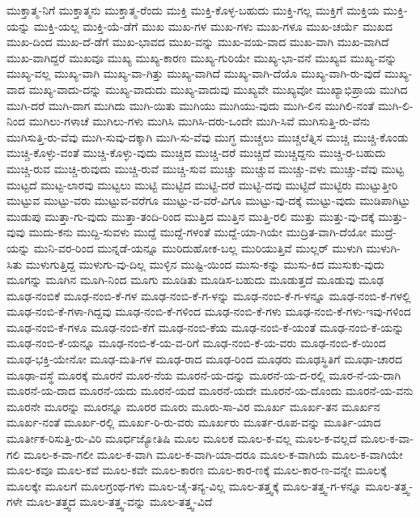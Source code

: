 {ಮುಕ್ತಾತ್ಮ-ನಿಗೆ
ಮುಕ್ತಾತ್ಮನು
ಮುಕ್ತಾತ್ಮ-ರೆಂದು
ಮುಕ್ತಿ
ಮುಕ್ತಿ-ಕೊಳ್ಳ-ಬಹುದು
ಮುಕ್ತಿ-ಗಲ್ಲ
ಮುಕ್ತಿಗೆ
ಮುಕ್ತಿಯ
ಮುಕ್ತಿ-ಯನ್ನು
ಮುಕ್ತಿ-ಯಲ್ಲ
ಮುಕ್ತಿ-ಯೆ-ಡೆಗೆ
ಮುಖ
ಮುಖ-ಗಳ
ಮುಖ-ಗಳು
ಮುಖ-ಗಳೂ
ಮುಖ-ಚರ್ಯೆ
ಮುಖದ
ಮುಖ-ದಿಂದ
ಮುಖ-ದೆ-ಡೆಗೆ
ಮುಖ-ಭಾವದ
ಮುಖ-ವನ್ನು
ಮುಖ-ವಯ-ವಾದ
ಮುಖ-ವಾಗಿ
ಮುಖ-ವಾಗಿದೆ
ಮುಖ-ವಾಗಿದ್ದರೆ
ಮುಖವೂ
ಮುಖ್ಯ
ಮುಖ್ಯ-ಕಾರಣ
ಮುಖ್ಯ-ಗುರಿಯೇ
ಮುಖ್ಯ-ಭಾ-ವನೆ
ಮುಖ್ಯವ
ಮುಖ್ಯ-ವನ್ನು
ಮುಖ್ಯ-ವಲ್ಲ
ಮುಖ್ಯ-ವಾಗಿ
ಮುಖ್ಯ-ವಾ-ಗಿತ್ತು
ಮುಖ್ಯ-ವಾಗಿದೆ
ಮುಖ್ಯ-ವಾಗಿ-ದೆಯೊ
ಮುಖ್ಯ-ವಾಗಿ-ರು-ವುದೆ
ಮುಖ್ಯ-ವಾದ
ಮುಖ್ಯ-ವಾದು-ದನ್ನು
ಮುಖ್ಯ-ವಾದುದು
ಮುಖ್ಯ-ವಾದುವು
ಮುಖ್ಯವೇ
ಮುಖ್ಯವೋ
ಮುಖ್ಯಾಭಿಪ್ರಾಯ
ಮುಗಿದ
ಮುಗಿ-ದರೆ
ಮುಗಿ-ದಾಗ
ಮುಗಿದು
ಮುಗಿ-ಯಿತು
ಮುಗಿಯು
ಮುಗಿಯು-ವುದು
ಮುಗಿ-ಲಿನ
ಮುಗಿಲಿ-ನಂತೆ
ಮುಗಿ-ಲಿ-ನಿಂದ
ಮುಗಿಲು-ಗಳಾಚೆ
ಮುಗಿಲು-ಗಳು
ಮುಗಿಸಿ
ಮುಗಿಸಿ-ದರು-ಒಂದೇ
ಮುಗಿ-ಸಿವೆ
ಮುಗಿಸುತ್ತಿ-ರು-ವೆನು
ಮುಗಿಸುತ್ತಿ-ರು-ವೆವು
ಮುಗಿ-ಸುವು-ದಕ್ಕಾಗಿ
ಮುಗಿ-ಸು-ವೆವು
ಮುಗ್ಧ
ಮುಚ್ಚಲು
ಮುಚ್ಚಲೆತ್ನಿಸ
ಮುಚ್ಚಿ
ಮುಚ್ಚಿ-ಕೊಂಡು
ಮುಚ್ಚಿ-ಕೊಳ್ಳು-ವಂತೆ
ಮುಚ್ಚಿ-ಕೊಳ್ಳು-ವುದು
ಮುಚ್ಚಿದ
ಮುಚ್ಚಿ-ದರೆ
ಮುಚ್ಚಿದೆ
ಮುಚ್ಚಿದ್ದನು
ಮುಚ್ಚಿ-ರ-ಬಹುದು
ಮುಚ್ಚಿ-ರುವ
ಮುಚ್ಚಿ-ರುವುದು
ಮುಚ್ಚಿ-ರುವೆ
ಮುಚ್ಚಿ-ಸುವ
ಮುಚ್ಚು
ಮುಚ್ಚುವ
ಮುಚ್ಚು-ವಳು
ಮುಚ್ಚು-ವೆವು
ಮುಟ್ಟ
ಮುಟ್ಟದೆ
ಮುಟ್ಟ-ಲಾರವು
ಮುಟ್ಟಲು
ಮುಟ್ಟಿ
ಮುಟ್ಟಿದ
ಮುಟ್ಟಿ-ದರೆ
ಮುಟ್ಟಿ-ದವು
ಮುಟ್ಟಿದೆ
ಮುಟ್ಟಿರು
ಮುಟ್ಟುತ್ತೀರಿ
ಮುಟ್ಟುವ
ಮುಟ್ಟು-ವರು
ಮುಟ್ಟುವ-ವರೆಗೂ
ಮುಟ್ಟು-ವ-ವರೆ-ವಿಗೂ
ಮುಟ್ಟು-ವು-ದಕ್ಕೆ
ಮುಟ್ಟು-ವುದು
ಮುಡಿಪಾಗಿಟ್ಟು
ಮುಡುಪು
ಮುತ್ತಾ-ಗು-ವುದು
ಮುತ್ತಾ-ತಂದಿ-ರಿಂದ
ಮುತ್ತಿದ
ಮುತ್ತಿನ
ಮುತ್ತಿ-ರಲಿ
ಮುತ್ತು
ಮುತ್ತು-ವು-ದಕ್ಕೆ
ಮುತ್ತು-ವುವು
ಮುದು-ಕನು
ಮುದ್ದಿ-ಸುವಳು
ಮುದ್ದೆ
ಮುದ್ದೆ-ಗಳಂತೆ
ಮುದ್ದೆ-ಯಾ-ಗಿಯೇ
ಮುದ್ರಿತ-ವಾಗಿ-ದೆಯೋ
ಮುದ್ರೆ-ಯನ್ನು
ಮುನಿ-ವರ-ರಿಂದ
ಮುನ್ನಡೆ-ಯನ್ನೂ
ಮುರಿದುಹೋಕ-ಬಲ್ಲ
ಮುರಿಯುತ್ತಿವೆ
ಮುಲ್ಲರ್
ಮುಳುಗಿ
ಮುಳುಗಿ-ಸಿತು
ಮುಳುಗುತ್ತಿದ್ದ
ಮುಳುಗು-ವು-ದಿಲ್ಲ
ಮುಳ್ಳಿನ
ಮುಷ್ಟಿ-ಯಿಂದ
ಮುಸು-ಕನ್ನು
ಮುಸು-ಕಿದ
ಮುಸುಕು-ವುದು
ಮೂಗನ್ನು
ಮೂಗಿನ
ಮೂಗಿ-ನಿಂದ
ಮೂಗು
ಮೂಡಿತು
ಮೂಡಿಸ-ಬಹುದು
ಮೂಡುತ್ತದೆ
ಮೂಡುವು
ಮೂಢ
ಮೂಢ-ನಂಬಿಕೆ
ಮೂಢ-ನಂಬಿ-ಕೆ-ಗಳ
ಮೂಢ-ನಂಬಿ-ಕೆ-ಗ-ಳನ್ನು
ಮೂಢ-ನಂಬಿ-ಕೆ-ಗ-ಳನ್ನೂ
ಮೂಢ-ನಂಬಿ-ಕೆ-ಗಳಲ್ಲಿ
ಮೂಢ-ನಂಬಿ-ಕೆ-ಗಳಾ-ಗಿದ್ದವು
ಮೂಢ-ನಂಬಿ-ಕೆ-ಗಳಿಂದ
ಮೂಢ-ನಂಬಿ-ಕೆ-ಗಳು
ಮೂಢ-ನಂಬಿ-ಕೆ-ಗಳು-ಇವು-ಗಳಿಂದ
ಮೂಢ-ನಂಬಿ-ಕೆ-ಗಳೂ
ಮೂಢ-ನಂಬಿ-ಕೆಗೆ
ಮೂಢ-ನಂಬಿ-ಕೆಯ
ಮೂಢ-ನಂಬಿ-ಕೆ-ಯಂತೆ
ಮೂಢ-ನಂಬಿ-ಕೆ-ಯನ್ನು
ಮೂಢ-ನಂಬಿ-ಕೆ-ಯನ್ನೂ
ಮೂಢ-ನಂಬಿ-ಕೆ-ಯ-ವ-ರಿಗೆ
ಮೂಢ-ನಂಬಿ-ಕೆ-ಯ-ವರು
ಮೂಢ-ನಂಬಿ-ಕೆ-ಯಿಂದ
ಮೂಢ-ಭಕ್ತಿ-ಯೇನೋ
ಮೂಢ-ಮತಿ-ಗಳ
ಮೂಢ-ರಾದ
ಮೂಢ-ರಿಂದ
ಮೂಢರು
ಮೂಢಸ್ಥಿತಿಗೆ
ಮೂಢಾ-ಚಾರದ
ಮೂಢಾ-ವಸ್ಥೆ
ಮೂರಕ್ಕೆ
ಮೂರನೆ
ಮೂರ-ನೆಯ
ಮೂರನೆ-ಯ-ದನ್ನು
ಮೂರನೆ-ಯ-ದ-ರಲ್ಲಿ
ಮೂರ-ನೆ-ಯ-ದಾಗಿ
ಮೂರನೆ-ಯ-ದಾದ
ಮೂರನೆ-ಯದು
ಮೂರನೆ-ಯದೆ
ಮೂರನೆ-ಯದೇ
ಮೂರನೆ-ಯ-ದೊಂದು
ಮೂರನೆ-ಯ-ವನು
ಮೂರನೇ
ಮೂರನ್ನು
ಮೂರನ್ನೂ
ಮೂರರ
ಮೂರು
ಮೂರು-ಸಾ-ವಿರ
ಮೂರ್ಖ
ಮೂರ್ಖ-ತನ
ಮೂರ್ಖನ
ಮೂರ್ಖ-ನಂತೆ
ಮೂರ್ಖ-ರಲ್ಲಿ
ಮೂರ್ಖ-ರಿ-ರು-ವರು
ಮೂರ್ಖರು
ಮೂರ್ತ-ರೂಪ-ವನ್ನು
ಮೂರ್ತಿ-ಯಾದ
ಮೂರ್ತೀಕ-ರಿಸುತ್ತಿ-ರು-ವಿರಿ
ಮೂರ್ಧಜ್ಯೋತಿಷಿ
ಮೂಲ
ಮೂಲಕ
ಮೂಲ-ಕ-ವಲ್ಲ
ಮೂಲ-ಕ-ವಲ್ಲದೆ
ಮೂಲ-ಕ-ವಾ-ಗಲಿ
ಮೂಲ-ಕ-ವಾ-ಗಲೀ
ಮೂಲ-ಕ-ವಾಗಿ
ಮೂಲ-ಕ-ವಾಗಿ-ಯಾ-ದರೂ
ಮೂಲ-ಕ-ವಾಗಿಯೆ
ಮೂಲ-ಕ-ವಾಗಿಯೇ
ಮೂಲ-ಕವೂ
ಮೂಲ-ಕವೆ
ಮೂಲ-ಕವೇ
ಮೂಲ-ಕಾರಣ
ಮೂಲ-ಕಾರ-ಣಕ್ಕೆ
ಮೂಲ-ಕಾರ-ಣ-ವನ್ನೇ
ಮೂಲಕ್ಕೆ
ಮೂಲಕ್ಕೇ
ಮೂಲಗೆ
ಮೂಲಗ್ರಂಥ-ಗಳು
ಮೂಲ-ಚೈ-ತನ್ಯ-ವಿಲ್ಲ
ಮೂಲ-ತತ್ತ್ವಕ್ಕೆ
ಮೂಲ-ತತ್ತ್ವ-ಗ-ಳನ್ನೂ
ಮೂಲ-ತತ್ತ್ವ-ಗಳೇ
ಮೂಲ-ತತ್ತ್ವದ
ಮೂಲ-ತತ್ತ್ವ-ವನ್ನು
ಮೂಲ-ತತ್ತ್ವ-ವಿದೆ
}

